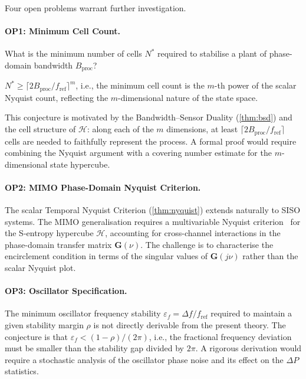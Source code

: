 \documentclass[10pt,twocolumn]{article}
\theoremstyle{plain}
\theoremstyle{definition}
\theoremstyle{remark}
\newcommand{\Hcal}{\mathcal{H}}
\newcommand{\DeltaP}{\Delta P}
\newcommand{\fref}{f_{\mathrm{ref}}}
\newcommand{\Bproc}{B_{\mathrm{proc}}}
\begin{document}
Four open problems warrant further investigation.

\paragraph{OP1: Minimum Cell Count.}
What is the minimum number of cells $N^*$ required to stabilise a
plant of phase-domain bandwidth $\Bproc$?

\begin{conjecture}
\label{conj:ncells}
$N^* \geq \lceil 2\Bproc/\fref \rceil^m$,
i.e., the minimum cell count is the $m$-th power of the scalar Nyquist
count, reflecting the $m$-dimensional nature of the state space.
\end{conjecture}

This conjecture is motivated by the Bandwidth--Sensor Duality
(\cref{thm:bsd}) and the cell structure of $\Hcal$: along each of the
$m$ dimensions, at least $\lceil 2\Bproc/\fref\rceil$ cells are needed
to faithfully represent the process.  A formal proof would require
combining the Nyquist argument with a covering number estimate for the
$m$-dimensional state hypercube.

\paragraph{OP2: MIMO Phase-Domain Nyquist Criterion.}
The scalar Temporal Nyquist Criterion (\cref{thm:nyquist}) extends
naturally to SISO systems.  The MIMO generalisation requires a
multivariable Nyquist criterion~\cite{Astrom2008} for the
S-entropy hypercube $\Hcal$, accounting for cross-channel interactions
in the phase-domain transfer matrix $\mathbf{G}(\nu)$.  The challenge
is to characterise the encirclement condition in terms of the singular
values of $\mathbf{G}(j\nu)$ rather than the scalar Nyquist plot.

\paragraph{OP3: Oscillator Specification.}
The minimum oscillator frequency stability $\varepsilon_f = \Delta f/\fref$
required to maintain a given stability margin $\rho$ is not directly
derivable from the present theory.  The conjecture is that
$\varepsilon_f < (1-\rho)/(2\pi)$, i.e., the fractional frequency
deviation must be smaller than the stability gap divided by $2\pi$.
A rigorous derivation would require a stochastic analysis of the
oscillator phase noise and its effect on the $\DeltaP$ statistics.
\end{document}
